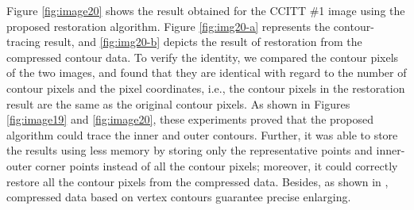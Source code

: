 Figure  \ref{fig:image20} shows the result obtained for the CCITT \#1 image using the proposed restoration algorithm. Figure \ref{fig:img20-a} represents the contour-tracing result, and \ref{fig:img20-b} depicts the result of restoration from the compressed contour data. To verify the identity, we compared the contour pixels of the two images, and found that they are identical with regard to the number of contour pixels and the pixel coordinates, i.e., the contour pixels in the restoration result are the same as the original contour pixels. As shown in Figures \ref{fig:image19} and \ref{fig:image20}, these experiments proved that the proposed algorithm could trace the inner and outer contours. Further, it was able to store the results using less memory by storing only the representative points and inner-outer corner points instead of all the contour pixels; moreover, it could correctly restore all the contour pixels from the compressed data. Besides, as shown in \cite{Miyatake1997Contour}, compressed data based on vertex contours guarantee precise enlarging.

